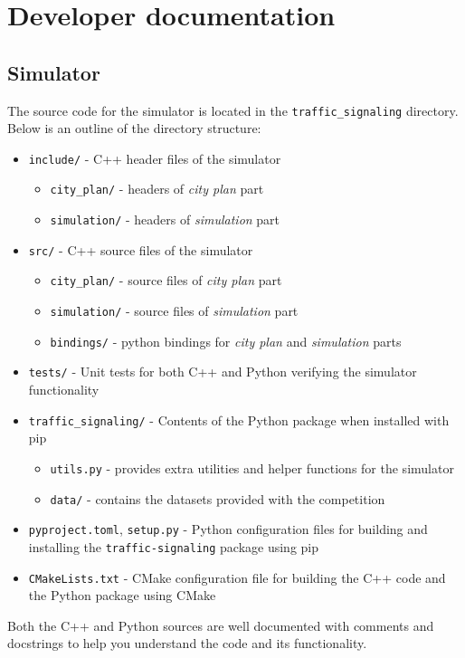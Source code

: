 \chapter{Developer documentation} \label{chap:developer_documentation}

\section{Simulator}

The source code for the simulator is located in the \verb|traffic_signaling| directory. Below is an outline of the directory structure:
\begin{itemize}
  \item \texttt{include/} - C++ header files of the simulator
  \begin{itemize}
    \item \texttt{city\_plan/} - headers of \textit{city plan} part
    \item \texttt{simulation/} - headers of \textit{simulation} part
  \end{itemize}

  \item \texttt{src/} - C++ source files of the simulator
  \begin{itemize}
    \item \texttt{city\_plan/} - source files of \textit{city plan} part
    \item \texttt{simulation/} - source files of \textit{simulation} part
    \item \texttt{bindings/} - python bindings for \textit{city plan} and \textit{simulation} parts
  \end{itemize}

  \item \texttt{tests/} - Unit tests for both C++ and Python verifying the simulator functionality

  \item \texttt{traffic\_signaling/} - Contents of the Python package when installed with pip
  \begin{itemize}
    \item \texttt{utils.py} - provides extra utilities and helper functions for the simulator
    \item \texttt{data/} - contains the datasets provided with the competition
  \end{itemize}

  \item \texttt{pyproject.toml}, \texttt{setup.py} - Python configuration files for building and installing the \texttt{traffic-signaling} package using pip

  \item \texttt{CMakeLists.txt} - CMake configuration file for building the C++ code and the Python package using CMake
\end{itemize}
Both the C++ and Python sources are well documented with comments and docstrings to help you understand the code and its functionality.

